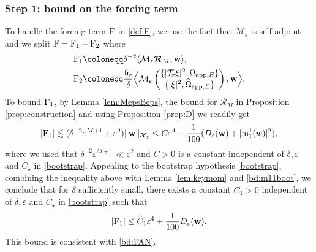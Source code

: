 \documentclass[11pt,reqno,a4paper]{amsart}
\def\eps{\varepsilon}
\newcommand{\cM}{\mathcal{M}}
\newcommand{\cR}{\mathcal{R}}
\newcommand{\cT}{\mathcal{T}}
\newcommand{\cX}{\mathcal{X}}
\newcommand{\app}{\mathrm{app}}
\newcommand{\mrm}{\mathrm{m}}
\newcommand{\1}{\mathbbm{1}}
\theoremstyle{definition}
\theoremstyle{definition}
\numberwithin{equation}{section}
\begin{document}
\subsubsection*{\textbf{Step 1: bound on the forcing term}}
To handle the forcing term ${\rm F}$ in \cref{def:F}, we use the fact that $\cM_{\eps}$ is self-adjoint and we split ${\rm F}={\rm F}_1+{\rm F}_2$ where 
        \begin{align}
           \label{def:F1}{\rm F}_1&\coloneqq\delta^{-2}\langle \cM_{\eps}\boldsymbol{\cR}_M,{\mathbf w}\rangle, \\
            \label{def:F2}
           {\rm F}_2&\coloneqq \frac{\mathfrak{b}_\eps}{\delta}\Big\langle\cM_{\eps} \begin{pmatrix}
                \{|\cT_{\eps} \xi|^2,\Omega_{\app,E}\}\\
                \{|\xi|^2,\widehat{\Omega}_{\app,E}\}
            \end{pmatrix}, {\mathbf w} \Big\rangle.
        \end{align}
        To bound ${\rm F}_1$, by Lemma \ref{lem:MepsBeps}, the bound for $\boldsymbol{\cR}_M$ in Proposition \ref{prop:construction} and using Proposition \ref{prop:D} we readily get 
\begin{align}
\label{bd:F1first}
   |{\rm F}_1|\lesssim (\delta^{-2}\eps^{M+1}+\eps^2)\|{\mathbf w}\|_{\boldsymbol{\cX}_\eps}\leq C\eps^4+\frac{1}{100}(D_{\eps}({\mathbf w})+|\mrm^1_1(w)|^2),
\end{align}
where we used that $\delta^{-2}\eps^{M+1}\ll \eps^2$ and $C>0$ is a constant independent of $\delta,\eps$ and $C_{\star}$ in \cref{bootstrap}. Appealing to the bootstrap hypothesis \cref{bootstrap}, combining the inequality above with Lemma \ref{lem:keymom} and \cref{bd:m11boot}, we conclude that for $\delta$ sufficiently small, there exists a constant $\widetilde{C}_1>0$ independent of $\delta,\eps$ and $C_{\star}$ in \cref{bootstrap} such that
\begin{align}
\label{bd:F1}
    |{\rm F}_1|\leq \widetilde{C}_1\eps^4 +\frac{1}{100}D_{\eps}({\mathbf w}).
\end{align}
 This bound is consistent with \cref{bd:FAN}.
\end{document}
